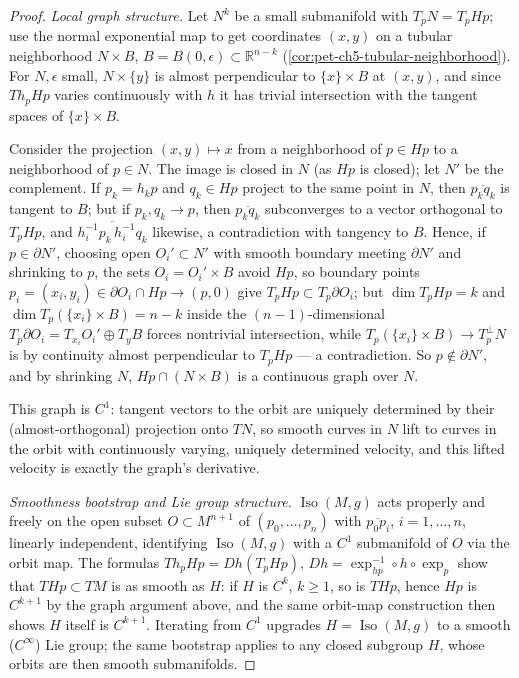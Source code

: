 \begin{proof}
  \emph{Local graph structure.} Let $N^k$ be a small submanifold with
  $T_pN=T_pHp$; use the normal exponential map to get coordinates $(x,y)$ on a
  tubular neighborhood $N\times B$, $B=B(0,\epsilon)\subset\mathbb R^{n-k}$
  (\cref{cor:pet-ch5-tubular-neighborhood}). For $N,\epsilon$ small, $N\times\{y\}$
  is almost perpendicular to $\{x\}\times B$ at $(x,y)$, and since $Th_pHp$ varies
  continuously with $h$ it has trivial intersection with the tangent spaces of
  $\{x\}\times B$.

  Consider the projection $(x,y)\mapsto x$ from a neighborhood of $p\in Hp$ to a
  neighborhood of $p\in N$. The image is closed in $N$ (as $Hp$ is closed); let
  $N'$ be the complement. If $p_k=h_kp$ and $q_k\in Hp$ project to the same point in
  $N$, then $\overline{p_kq_k}$ is tangent to $B$; but if $p_k,q_k\to p$, then
  $\overline{p_kq_k}$ subconverges to a vector orthogonal to $T_pHp$, and
  $\overline{h_i^{-1}p_k\,h_i^{-1}q_k}$ likewise, a contradiction with tangency to
  $B$. Hence, if $p\in\partial N'$, choosing open $O_i'\subset N'$ with smooth
  boundary meeting $\partial N'$ and shrinking to $p$, the sets $O_i=O_i'\times B$
  avoid $Hp$, so boundary points $p_i=(x_i,y_i)\in\partial O_i\cap Hp\to(p,0)$ give
  $T_pHp\subset T_p\partial O_i$; but $\dim T_pHp=k$ and
  $\dim T_p(\{x_i\}\times B)=n-k$ inside the $(n-1)$-dimensional
  $T_p\partial O_i=T_{x_i}O_i'\oplus T_yB$ forces nontrivial intersection, while
  $T_p(\{x_i\}\times B)\to T_p^\perp N$ is by continuity almost perpendicular to
  $T_pHp$ — a contradiction. So $p\notin\partial N'$, and by shrinking $N$,
  $Hp\cap(N\times B)$ is a continuous graph over $N$.

  This graph is $C^1$: tangent vectors to the orbit are uniquely determined by
  their (almost-orthogonal) projection onto $TN$, so smooth curves in $N$ lift to
  curves in the orbit with continuously varying, uniquely determined velocity, and
  this lifted velocity is exactly the graph's derivative.

  \emph{Smoothness bootstrap and Lie group structure.} $\operatorname{Iso}(M,g)$
  acts properly and freely on the open subset $O\subset M^{n+1}$ of
  $(p_0,\dots,p_n)$ with $\overline{p_0p_i}$, $i=1,\dots,n$, linearly independent,
  identifying $\operatorname{Iso}(M,g)$ with a $C^1$ submanifold of $O$ via the
  orbit map. The formulas $Th_pHp=Dh(T_pHp)$, $Dh=\exp_{hp}^{-1}\circ h\circ
  \exp_p$ show that $THp\subset TM$ is as smooth as $H$: if $H$ is $C^k$, $k\ge1$,
  so is $THp$, hence $Hp$ is $C^{k+1}$ by the graph argument above, and the same
  orbit-map construction then shows $H$ itself is $C^{k+1}$. Iterating from
  $C^1$ upgrades $H=\operatorname{Iso}(M,g)$ to a smooth ($C^\infty$) Lie group; the
  same bootstrap applies to any closed subgroup $H$, whose orbits are then smooth
  submanifolds.
\end{proof}


